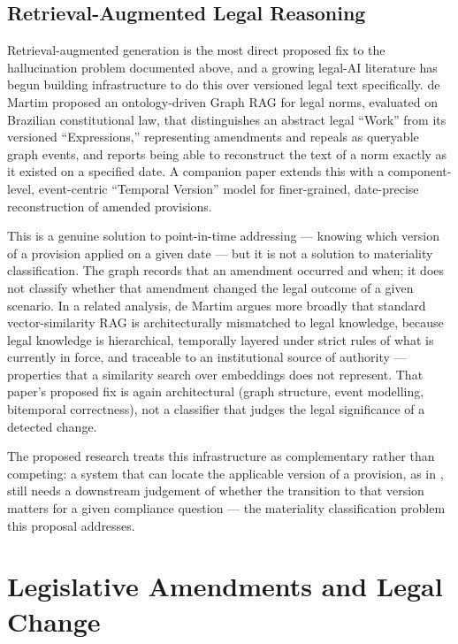 \subsection{Retrieval-Augmented Legal Reasoning}

\label{sec:2-5-3}

Retrieval-augmented generation is the most direct proposed fix to the hallucination problem documented above, and a growing legal-AI literature has begun building infrastructure to do this over versioned legal text specifically. de Martim \cite{demartim2025satgraph} proposed an ontology-driven Graph RAG for legal norms, evaluated on Brazilian constitutional law, that distinguishes an abstract legal “Work” from its versioned “Expressions,” representing amendments and repeals as queryable graph events, and reports being able to reconstruct the text of a norm exactly as it existed on a specified date. A companion paper \cite{demartim2025lrmoo} extends this with a component-level, event-centric “Temporal Version” model for finer-grained, date-precise reconstruction of amended provisions.

This is a genuine solution to point-in-time addressing — knowing which version of a provision applied on a given date — but it is not a solution to materiality classification. The graph records that an amendment occurred and when; it does not classify whether that amendment changed the legal outcome of a given scenario. In a related analysis, de Martim \cite{demartim2026beyondprobabilistic} argues more broadly that standard vector-similarity RAG is architecturally mismatched to legal knowledge, because legal knowledge is hierarchical, temporally layered under strict rules of what is currently in force, and traceable to an institutional source of authority — properties that a similarity search over embeddings does not represent. That paper's proposed fix is again architectural (graph structure, event modelling, bitemporal correctness), not a classifier that judges the legal significance of a detected change.

The proposed research treats this infrastructure as complementary rather than competing: a system that can locate the applicable version of a provision, as in \cite{demartim2025satgraph,demartim2025lrmoo}, still needs a downstream judgement of whether the transition to that version matters for a given compliance question — the materiality classification problem this proposal addresses.

\section{Legislative Amendments and Legal Change}

